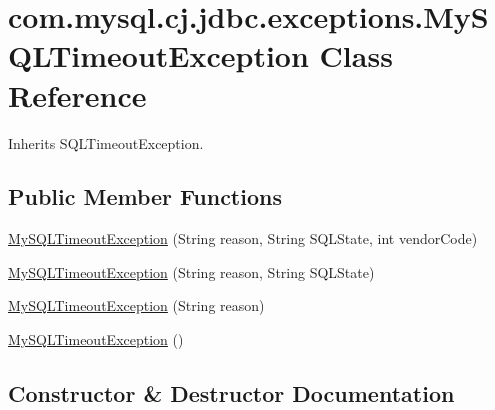 \hypertarget{classcom_1_1mysql_1_1cj_1_1jdbc_1_1exceptions_1_1_my_s_q_l_timeout_exception}{}\section{com.\+mysql.\+cj.\+jdbc.\+exceptions.\+My\+S\+Q\+L\+Timeout\+Exception Class Reference}
\label{classcom_1_1mysql_1_1cj_1_1jdbc_1_1exceptions_1_1_my_s_q_l_timeout_exception}


Inherits S\+Q\+L\+Timeout\+Exception.

\subsection*{Public Member Functions}
\begin{DoxyCompactItemize}
\item 
\mbox{\hyperlink{classcom_1_1mysql_1_1cj_1_1jdbc_1_1exceptions_1_1_my_s_q_l_timeout_exception_aa21b8a76b6188df8aa8bf007afc09ac6}{My\+S\+Q\+L\+Timeout\+Exception}} (String reason, String S\+Q\+L\+State, int vendor\+Code)
\item 
\mbox{\hyperlink{classcom_1_1mysql_1_1cj_1_1jdbc_1_1exceptions_1_1_my_s_q_l_timeout_exception_a6e7a777a6fa12a53fc32395fccf4614c}{My\+S\+Q\+L\+Timeout\+Exception}} (String reason, String S\+Q\+L\+State)
\item 
\mbox{\hyperlink{classcom_1_1mysql_1_1cj_1_1jdbc_1_1exceptions_1_1_my_s_q_l_timeout_exception_a47c18912c5a1378906617e7819c23e21}{My\+S\+Q\+L\+Timeout\+Exception}} (String reason)
\item 
\mbox{\hyperlink{classcom_1_1mysql_1_1cj_1_1jdbc_1_1exceptions_1_1_my_s_q_l_timeout_exception_a399941d0a3bc1e7932494656548df7c2}{My\+S\+Q\+L\+Timeout\+Exception}} ()
\end{DoxyCompactItemize}


\subsection{Constructor \& Destructor Documentation}
\mbox{\label{classcom_1_1mysql_1_1cj_1_1jdbc_1_1exceptions_1_1_my_s_q_l_timeout_exception_aa21b8a76b6188df8aa8bf007afc09ac6}} 
